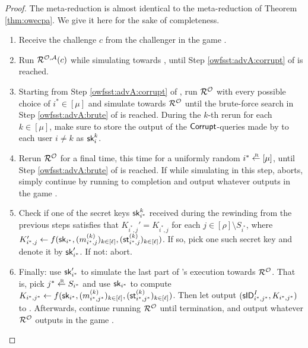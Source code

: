 \begin{proof}
  The meta-reduction \redM is almost identical to the meta-reduction of Theorem \ref{thm:owecpa}.
  We give it here for the sake of completeness.
  \begin{enumerate}[itemsep=0.1cm]
    \item Receive the challenge \(c\) from the challenger in the game \Simple.
    \item Run \(\redR^{\oracle,\advA}(c)\) while simulating \advA towards \redR,
          until Step \ref{owfsst:advA:corrupt} of \advA is reached.
    \item\label{owfsst:advM:rewind} Starting from Step \ref{owfsst:advA:corrupt} of \advA,
          run \(\redR^{\oracle}\) with every possible choice of \(i^{*} \in [\mu]\)
          and simulate \advA towards \(\redR^{\oracle}\)
          until the brute-force search in Step \ref{owfsst:advA:brute} of \advA is reached.
          During the \(k\)-th rerun for each \(k \in [\mu]\), make sure to store the output of
          the \(\mathsf{Corrupt}\)-queries made by \advA to each user \(i \ne k\) as \(\mathsf{sk}_{i}^{k}\).
    \item\label{owfsst:advM:sample} Rerun \(\redR^{\oracle}\) for a final time,
          this time for a uniformly random \(i^{*} \sampleR [\mu]\),
          until Step \ref{owfsst:advA:brute} of \advA is reached.
          If while simulating \advA in this step, \advA aborts,
          simply continue by running \redR to completion
          and output whatever \redR outputs in the game \Simple.
    \item\label{owfsst:advM:key} Check if one of the secret keys \(\mathsf{sk}_{i^{*}}^{k}\)
          received during the rewinding from the previous steps satisfies that
          \(K_{i^{*},j}' = K_{i^{*},j}\) for each \(j \in [\rho] \setminus S_{i^{*}}\),
          where \(K_{i^{*},j}' \leftarrow f(\mathsf{sk}_{i^{*}},(m_{i^{*},j}^{(k)})_{k \in [\ell]},(\mathsf{st}_{i^{*},j}^{(k)})_{k \in [\ell]})\).
          If so, pick one such secret key and denote it by \(\mathsf{sk}_{i^{*}}'\).
          If not: abort.
    \item Finally: use \(\mathsf{sk}_{i^{*}}'\) to simulate the last part of \advA's execution towards \(\redR^{\oracle}\).
          That is, pick \(j^{*} \sampleR S_{i^{*}}\) and use \(\mathsf{sk}_{i^{*}}\) to compute
          \(K_{i^{*}, j^{*}} \leftarrow f(\mathsf{sk}_{i^{*}},(m_{i^{*},j^{*}}^{(k)})_{k \in [\ell]},(\mathsf{st}_{i^{*},j^{*}}^{(k)})_{k \in [\ell]})\).
          Then let \advA output \((\mathsf{sID}_{i^{*},j^{*}}^{I}, K_{i^{*}, j^{*}})\) to \redR.
          Afterwards, continue running \(\redR^{\oracle}\) until termination,
          and output whatever \(\redR^{\oracle}\) outputs in the game \Simple.
  \end{enumerate}


\end{proof}
